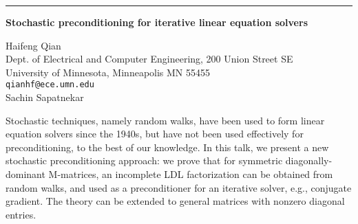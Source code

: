 \documentclass[twosided]{report}
\begin{document}
	\begin{center} \rule{6in}{1pt} \end{center}

\begin{center}
{\large			%
{\bf Stochastic preconditioning for iterative linear equation solvers}}

	Haifeng Qian \\
	Dept. of Electrical and Computer Engineering, 200 Union Street SE \\
	University of Minnesota, Minneapolis MN 55455 \\
	{\tt qianhf@ece.umn.edu} \\
	Sachin Sapatnekar
\end{center}
Stochastic techniques, namely random walks, have been used
to form linear equation solvers since the 1940s, but have
not been used effectively for preconditioning, to the best
of our knowledge. In this talk, we present a new stochastic
preconditioning approach: we prove that for symmetric
diagonally-dominant M-matrices, an incomplete LDL
factorization can be obtained from random walks, and used as
a preconditioner for an iterative solver, e.g., conjugate
gradient. The theory can be extended to general matrices
with nonzero diagonal entries.
\end{document}
